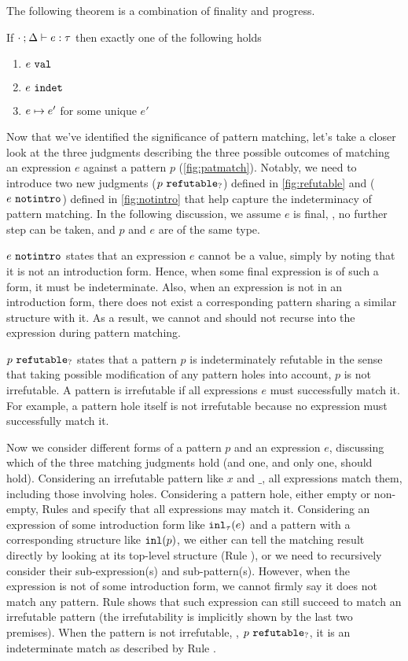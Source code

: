 The following theorem is a combination of finality and progress.
\begin{theorem}[Determinism]
  \label{theorem:determinism}
  If $\cdot \mathbin{;} \Delta \vdash e : \tau$ then exactly one of the following holds
  \begin{enumerate}
    \item $e ~\mathtt{val}$
    \item $e ~\mathtt{indet}$
    \item $e \mapsto e'$ for some unique $e'$
  \end{enumerate}
\end{theorem}




Now that we've identified the significance of pattern matching, let's take a closer look at the three judgments describing the three possible outcomes of matching an expression $e$ against a pattern $p$ (\autoref{fig:patmatch}). Notably, we need to introduce two new judgments ($p ~\mathtt{refutable}_?$) defined in \autoref{fig:refutable} and ($e ~\mathtt{notintro}$) defined in \autoref{fig:notintro} that help capture the indeterminacy of pattern matching. In the following discussion, we assume $e$ is final, \ie, no further step can be taken, and $p$ and $e$ are of the same type.

$e ~\mathtt{notintro}$ states that an expression $e$ cannot be a value, simply by noting that it is not an introduction form. Hence, when some final expression is of such a form, it must be indeterminate. Also, when an expression is not in an introduction form, there does not exist a corresponding pattern sharing a similar structure with it. As a result, we cannot and should not recurse into the expression during pattern matching.

$p ~\mathtt{refutable}_?$ states that a pattern $p$ is indeterminately refutable in the sense that taking possible modification of any pattern holes into account, $p$ is not irrefutable. A pattern is irrefutable if all expressions $e$ must successfully match it. For example, a pattern hole itself is not irrefutable because no expression must successfully match it.

Now we consider different forms of a pattern $p$ and an expression $e$, discussing which of the three matching judgments hold (and one, and only one, should hold).
Considering an irrefutable pattern like $x$ and $\_$, all expressions match them, including those involving holes.
Considering a pattern hole, either empty or non-empty, Rules \MMEHole and \MMHole specify that all expressions may match it.
Considering an expression of some introduction form like $\mathtt{inl}_{\tau}({e})$ and a pattern with a corresponding structure like $\mathtt{inl}(p)$, we either can tell the matching result directly by looking at its top-level structure (Rule \NMConfR), or we need to recursively consider their sub-expression(s) and sub-pattern(s).
However, when the expression is not of some introduction form, we cannot firmly say it does not match any pattern. Rule \MNotIntroPair shows that such expression can still succeed to match an irrefutable pattern (the irrefutability is implicitly shown by the last two premises). When the pattern is not irrefutable, \ie, $p ~\mathtt{refutable}_?$, it is an indeterminate match as described by Rule \MMNotIntro.

